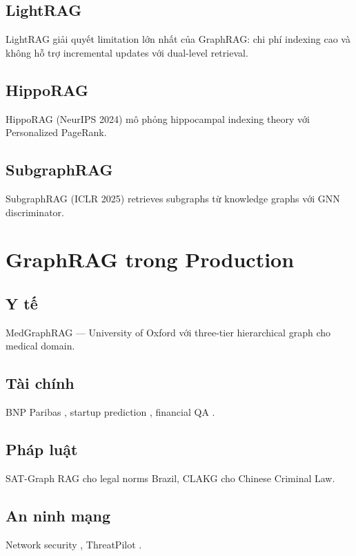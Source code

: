 \documentclass[conference]{IEEEtran}
\begin{document}
\subsection{LightRAG}
LightRAG \cite{guo2024lightrag} giải quyết limitation lớn nhất của GraphRAG: chi phí indexing cao và không hỗ trợ incremental updates với dual-level retrieval.

\subsection{HippoRAG}
HippoRAG \cite{gutierrez2024hipporag} (NeurIPS 2024) mô phỏng hippocampal indexing theory với Personalized PageRank.

\subsection{SubgraphRAG}
SubgraphRAG \cite{li2024subgraphrag} (ICLR 2025) retrieves subgraphs từ knowledge graphs với GNN discriminator.

\section{GraphRAG trong Production}

\subsection{Y tế}
MedGraphRAG \cite{wu2024medgraphrag} --- University of Oxford với three-tier hierarchical graph cho medical domain.

\subsection{Tài chính}
BNP Paribas \cite{barry2025bnp}, startup prediction \cite{gao2024startup}, financial QA \cite{shah2024financialqa}.

\subsection{Pháp luật}
SAT-Graph RAG \cite{demartim2025satgraph} cho legal norms Brazil, CLAKG \cite{chen2024clakg} cho Chinese Criminal Law.

\subsection{An ninh mạng}
Network security \cite{carvalho2024netsec}, ThreatPilot \cite{xu2024threatpilot}.
\end{document}
